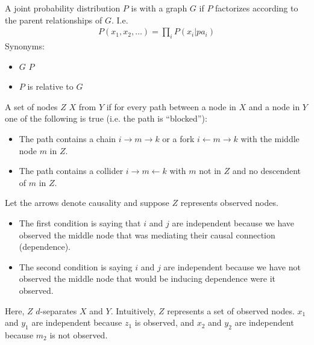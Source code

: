 \begin{definition}
  A joint probability distribution $P$ is  with a graph $G$ if $P$ factorizes according to the
  parent relationships of $G$. I.e.
\begin{align*}
  P(x_1, x_2, \ldots) = \prod_i P(x_i|pa_i)
\end{align*}
 Synonyms:
 \begin{itemize}
 \item $G$  $P$
 \item $P$ is  relative to $G$
 \end{itemize}
\end{definition}

\begin{definition}
  A set of nodes $Z$  $X$ from $Y$ if for every path between a node in $X$ and a node in $Y$ one
  of the following is true (i.e. the path is ``blocked''):
  \begin{itemize}
  \item The path contains a chain $i \rightarrow m \rightarrow k$ or a fork $i \leftarrow m \rightarrow k$ with the middle node $m$ in $Z$.
  \item The path contains a collider $i \rightarrow m \leftarrow k$ with $m$ not in $Z$ and no descendent of $m$ in $Z$.
  \end{itemize}
\end{definition}

\begin{intuition}
  Let the arrows denote causality and suppose $Z$ represents observed nodes.
  \begin{itemize}
  \item The first condition is saying that $i$ and $j$ are independent because we have observed the middle node
    that was mediating their causal connection (dependence).
  \item The second condition is saying $i$ and $j$ are independent because we have not observed the middle node
    that would be inducing dependence were it observed.
  \end{itemize}
\end{intuition}




Here, $Z$ $d$-separates $X$ and $Y$. Intuitively, $Z$ represents a set of observed nodes. $x_1$ and $y_1$
are independent because $z_1$ is observed, and $x_2$ and $y_2$ are independent because $m_2$ is not observed.

